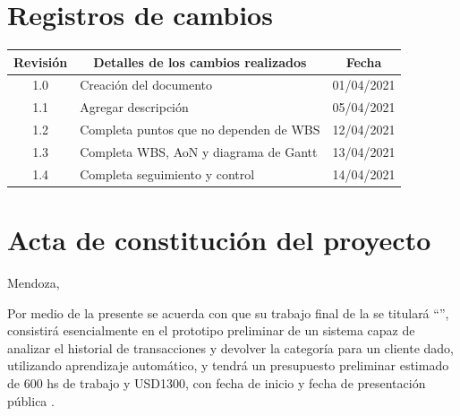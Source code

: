 \documentclass[11pt]{charter}
\begin{document}
\maketitle
\thispagestyle{empty}
\pagebreak


\thispagestyle{empty}
{\setlength{\parskip}{0pt}
\tableofcontents{}
}
\pagebreak


\section{Registros de cambios}
\label{sec:registro}


\begin{table}[ht]
\label{tab:registro}
\centering
\begin{tabularx}{\linewidth}{@{}|c|X|c|@{}}
\hline
\rowcolor[HTML]{C0C0C0} 
Revisión & \multicolumn{1}{c|}{\cellcolor[HTML]{C0C0C0}Detalles de los cambios realizados} & Fecha      \\ \hline
1.0      & Creación del documento                                          & 01/04/2021 \\ \hline
1.1      & Agregar descripción                                          & 05/04/2021 \\ \hline
1.2      & Completa puntos que no dependen de WBS                       & 12/04/2021 \\ \hline
1.3      & Completa WBS, AoN y diagrama de Gantt                        & 13/04/2021 \\ \hline
1.4      & Completa seguimiento y control                               & 14/04/2021 \\ \hline
\end{tabularx}
\end{table}

\pagebreak



\section{Acta de constitución del proyecto}
\label{sec:acta}

\begin{flushright}
Mendoza, \fechaInicioName
\end{flushright}

\vspace{2cm}

Por medio de la presente se acuerda con \authorname\hspace{1px} que su trabajo final de la \degreename\hspace{1px} 
se titulará ``\ttitle'', consistirá esencialmente en el prototipo preliminar de un sistema capaz de analizar el historial de 
transacciones y devolver la categoría para un cliente dado, utilizando aprendizaje automático, y tendrá un presupuesto 
preliminar estimado de 600 hs de trabajo y USD1300, con fecha de inicio \fechaInicioName\hspace{1px} y fecha de presentación 
pública \fechaFinalName.
\end{document}
